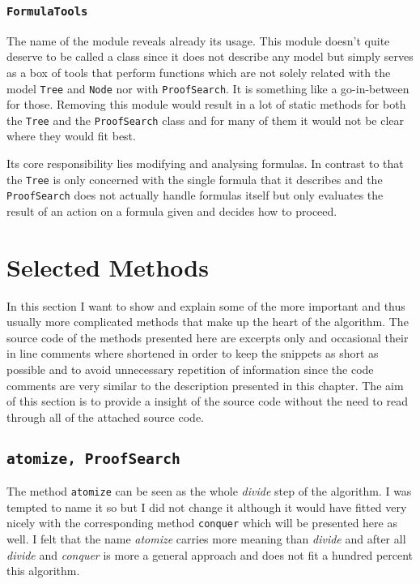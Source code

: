 \subsubsection[FormulaTools]{\texttt{FormulaTools}}
The name of the module reveals already its usage. This module doesn't quite deserve to be called a class since it does not describe any model but simply serves as a box of tools that perform functions which are not solely related with the model \texttt{Tree} and \texttt{Node} nor with \texttt{ProofSearch}. It is something like a go-in-between for those. Removing this module would result in a lot of static methods for both the \texttt{Tree} and the \texttt{ProofSearch} class and for many of them it would not be clear where they would fit best. 

Its core responsibility lies modifying and analysing formulas. In contrast to that the \texttt{Tree} is only concerned with the single formula that it describes and the \texttt{ProofSearch} does not actually handle formulas itself but only evaluates the result of an action on a formula given and decides how to proceed.


\section{Selected Methods}
In this section I want to show and explain some of the more important and thus usually more complicated methods that make up the heart of the algorithm. The source code of the methods presented here are excerpts only and occasional their in line comments where shortened in order to keep the snippets as short as possible and to avoid unnecessary repetition of information since the code comments are very similar to the description presented in this chapter. The aim of this section is to provide a insight of the source code without the need to read through all of the attached source code. 

\subsection[atomize]{\texttt{atomize, ProofSearch}}
The method \texttt{atomize} can be seen as the whole \emph{divide} step of the algorithm. I was tempted to name it so but I did not change it although it would have fitted very nicely with the corresponding method \texttt{conquer} which will be presented here as well. I felt that the name \emph{atomize} carries more meaning than \emph{divide} and after all \emph{divide} and \emph{conquer} is more a general approach and does not fit a hundred percent this algorithm.

